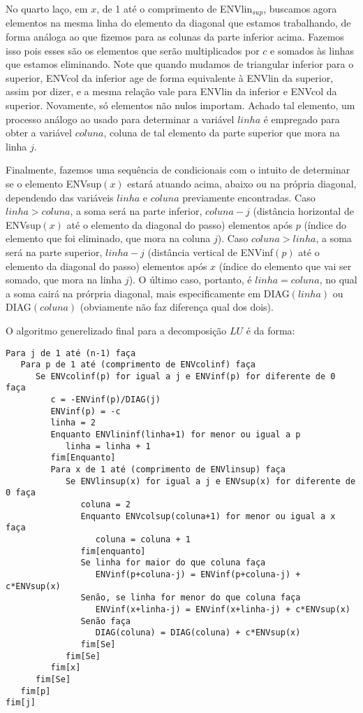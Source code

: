 \documentclass[a4paper, 12pt]{article}
\begin{document}
No quarto laço, em $x$, de 1 até o comprimento de ENVlin$_{sup}$, buscamos agora elementos na mesma linha do elemento da diagonal que estamos trabalhando, de forma análoga ao que fizemos para as colunas da parte inferior acima. Fazemos isso pois esses são os elementos que serão multiplicados por $c$ e somados às linhas que estamos eliminando. Note que quando mudamos de triangular inferior para o superior, ENVcol da inferior age de forma equivalente à ENVlin da superior, assim por dizer, e a mesma relação vale para ENVlin da inferior e ENVcol da superior. Novamente, só elementos não nulos importam. Achado tal elemento, um processo análogo ao usado para determinar a variável $linha$ é empregado para obter a variável $coluna$, coluna de tal elemento da parte superior que mora na linha $j$.

Finalmente, fazemos uma sequência de condicionais com o intuito de determinar se o elemento ENVsup$(x)$ estará atuando acima, abaixo ou na própria diagonal, dependendo das variáveis $linha$ e $coluna$ previamente encontradas. Caso $linha>coluna$, a soma será na parte inferior, $coluna-j$ (distância horizontal de ENVsup$(x)$ até o elemento da diagonal do passo) elementos após $p$ (índice do elemento que foi eliminado, que mora na coluna $j$). Caso $coluna>linha$, a soma será na parte superior, $linha-j$ (distância vertical de ENVinf$(p)$ até o elemento da diagonal do passo) elementos após $x$ (índice do elemento que vai ser somado, que mora na linha $j$). O último caso, portanto, é $linha=coluna$, no qual a soma cairá na prórpria diagonal, mais especificamente em DIAG$(linha)$ ou DIAG$(coluna)$ (obviamente não faz diferença qual dos dois). 

O algoritmo generelizado final para a decomposição $LU$ é da forma:

\begin{verbatim}
Para j de 1 até (n-1) faça
   Para p de 1 até (comprimento de ENVcolinf) faça
      Se ENVcolinf(p) for igual a j e ENVinf(p) for diferente de 0 faça
         c = -ENVinf(p)/DIAG(j)
         ENVinf(p) = -c
         linha = 2
         Enquanto ENVlininf(linha+1) for menor ou igual a p
            linha = linha + 1
         fim[Enquanto]
         Para x de 1 até (comprimento de ENVlinsup) faça
            Se ENVlinsup(x) for igual a j e ENVsup(x) for diferente de 0 faça
               coluna = 2
               Enquanto ENVcolsup(coluna+1) for menor ou igual a x faça
                  coluna = coluna + 1
               fim[enquanto]
               Se linha for maior do que coluna faça
                  ENVinf(p+coluna-j) = ENVinf(p+coluna-j) + c*ENVsup(x)
               Senão, se linha for menor do que coluna faça
                  ENVinf(x+linha-j) = ENVinf(x+linha-j) + c*ENVsup(x)
               Senão faça
                  DIAG(coluna) = DIAG(coluna) + c*ENVsup(x)
               fim[Se]
            fim[Se]
         fim[x]
      fim[Se]
   fim[p]
fim[j]
\end{verbatim}
\end{document}
